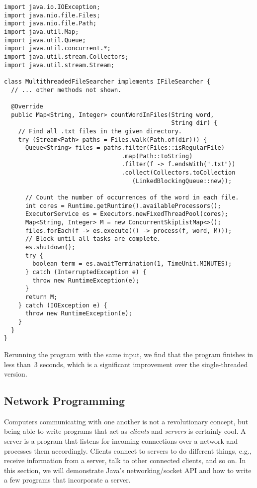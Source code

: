 \begin{lstlisting}[language=MyJava]
import java.io.IOException;
import java.nio.file.Files;
import java.nio.file.Path;
import java.util.Map;
import java.util.Queue;
import java.util.concurrent.*;
import java.util.stream.Collectors;
import java.util.stream.Stream;

class MultithreadedFileSearcher implements IFileSearcher {
  // ... other methods not shown.

  @Override
  public Map<String, Integer> countWordInFiles(String word,
                                               String dir) {
    // Find all .txt files in the given directory.
    try (Stream<Path> paths = Files.walk(Path.of(dir))) {
      Queue<String> files = paths.filter(Files::isRegularFile)
                                 .map(Path::toString)
                                 .filter(f -> f.endsWith(".txt"))
                                 .collect(Collectors.toCollection
                                    (LinkedBlockingQueue::new));

      // Count the number of occurrences of the word in each file.
      int cores = Runtime.getRuntime().availableProcessors();
      ExecutorService es = Executors.newFixedThreadPool(cores);
      Map<String, Integer> M = new ConcurrentSkipListMap<>();
      files.forEach(f -> es.execute(() -> process(f, word, M)));
      // Block until all tasks are complete.
      es.shutdown();
      try {
        boolean term = es.awaitTermination(1, TimeUnit.MINUTES);
      } catch (InterruptedException e) {
        throw new RuntimeException(e);
      }
      return M;
    } catch (IOException e) {
      throw new RuntimeException(e);
    }
  }
}
\end{lstlisting}

Rerunning the program with the same input, we find that the program finishes in less than~$3$ seconds, which is a significant improvement over the single-threaded version.

\subsection{Network Programming}

Computers communicating with one another is not a revolutionary concept, but being able to write programs that act as \emph{clients} and \emph{servers} is certainly cool. 
A server is a program that listens for incoming connections over a network and processes them accordingly. 
Clients connect to servers to do different things, e.g., receive information from a server, talk to other connected clients, and so on. 
In this section, we will demonstrate Java's networking/socket API and how to write a few programs that incorporate a server.


